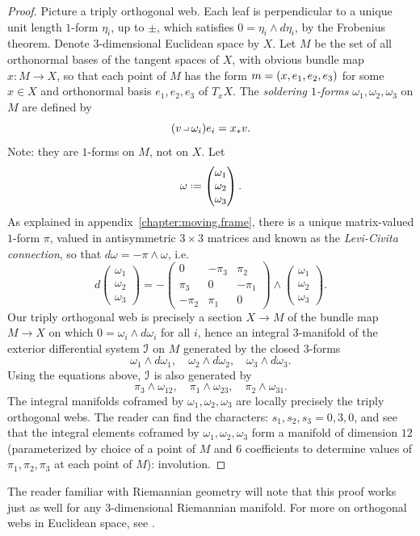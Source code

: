 \begin{proof}
Picture a triply orthogonal web.
Each leaf is perpendicular to a unique unit length \(1\)-form \(\eta_i\), up to \(\pm\), which satisfies \(0=\eta_i \wedge d \eta_i\), by the Frobenius theorem.
Denote \(3\)-dimensional Euclidean space by \(X\).
Let \(M\) be the set of all orthonormal bases of the tangent spaces of \(X\), with obvious bundle map \(x \colon M \to X\), so that each point of \(M\) has the form \(m=\left(x,e_1,e_2,e_3\right)\) for some \(x \in X\) and orthonormal basis \(e_1,e_2,e_3\) of \(T_x X\).
The \emph{soldering \(1\)-forms} \(\omega_1, \omega_2, \omega_3\) on \(M\) are defined by 
\[
(v \hook \omega_i)e_i = x_* v.
\]
Note: they are \(1\)-forms on \(M\), not on \(X\).
Let 
\[
\omega
\defeq
\begin{pmatrix}
\omega_1 \\
\omega_2 \\
\omega_3
\end{pmatrix}.
\]
As explained in appendix~\ref{chapter:moving.frame}, there is a unique matrix-valued \(1\)-form \(\pi\), valued in antisymmetric \(3 \times 3\) matrices and known as the \emph{Levi-Civita connection}, so that \(d \omega = -\pi \wedge \omega\), i.e.
\[
d
\begin{pmatrix}
\omega_1 \\
\omega_2 \\
\omega_3
\end{pmatrix}
=
-
\begin{pmatrix}
0 & -\pi_3 & \pi_2 \\
\pi_3 & 0 & -\pi_1 \\
-\pi_2 & \pi_1 & 0
\end{pmatrix}
\wedge
\begin{pmatrix}
\omega_1 \\
\omega_2 \\
\omega_3
\end{pmatrix}.
\]
Our triply orthogonal web is precisely a section \(X \to M\) of the bundle map \(M \to X\) on which \(0=\omega_i \wedge d\omega_i\) for all \(i\), hence an integral \(3\)-manifold of the exterior differential system \(\mathcal{I}\) on \(M\) generated by the closed \(3\)-forms
\[
\omega_1 \wedge d \omega_1, \quad
\omega_2 \wedge d \omega_2, \quad
\omega_3 \wedge d \omega_3.
\]
Using the equations above, \(\mathcal{I}\) is also generated by
\[
\pi_3 \wedge \omega_{12}, \quad
\pi_1 \wedge \omega_{23}, \quad
\pi_2 \wedge \omega_{31}.
\]
The integral manifolds coframed by \(\omega_1,\omega_2,\omega_3\) are locally precisely the triply orthogonal webs.
The reader can find the characters: \(s_1,s_2,s_3=0,3,0\), and see that the integral elements coframed by \(\omega_1,\omega_2,\omega_3\) form a manifold of dimension \(12\) (parameterized by choice of a point of \(M\) and \(6\) coefficients to determine values of \(\pi_1,\pi_2,\pi_3\) at each point of \(M\)): involution.
\end{proof}
The reader familiar with Riemannian geometry will note that this proof works just as well for any \(3\)-dimensional Riemannian manifold.
For more on orthogonal webs in Euclidean space, see \cite{Darboux:1993,DeTurck/Yang:1984,Terng/Uhlenbeck:1998,Zakharov:1998}.

